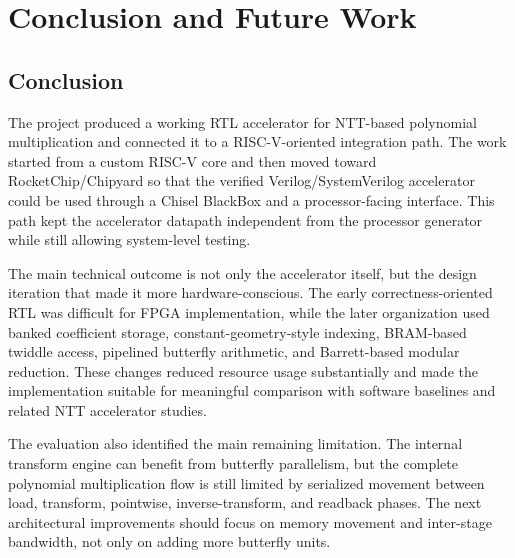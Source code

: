 \documentclass[a4paper, 12pt, titlepage]{article}
\begin{document}
\newpage
\section{Conclusion and Future Work}

\subsection{Conclusion}

The project produced a working RTL accelerator for NTT-based polynomial multiplication and connected it to a RISC-V-oriented integration path. The work started from a custom RISC-V core and then moved toward RocketChip/Chipyard so that the verified Verilog/SystemVerilog accelerator could be used through a Chisel BlackBox and a processor-facing interface. This path kept the accelerator datapath independent from the processor generator while still allowing system-level testing.

The main technical outcome is not only the accelerator itself, but the design iteration that made it more hardware-conscious. The early correctness-oriented RTL was difficult for FPGA implementation, while the later organization used banked coefficient storage, constant-geometry-style indexing, BRAM-based twiddle access, pipelined butterfly arithmetic, and Barrett-based modular reduction. These changes reduced resource usage substantially and made the implementation suitable for meaningful comparison with software baselines and related NTT accelerator studies.

The evaluation also identified the main remaining limitation. The internal transform engine can benefit from butterfly parallelism, but the complete polynomial multiplication flow is still limited by serialized movement between load, transform, pointwise, inverse-transform, and readback phases. The next architectural improvements should focus on memory movement and inter-stage bandwidth, not only on adding more butterfly units.
\end{document}
